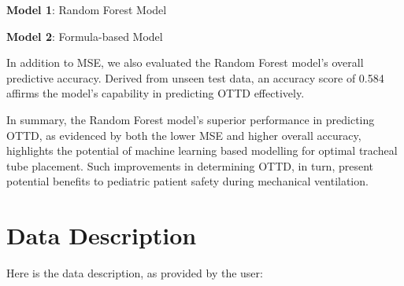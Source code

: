\documentclass[11pt]{article}
\begin{document}
\begin{table}[h]
\caption{Comparison of residuals for Random Forest and Formula-based Models}
\label{table:t1}
\begin{threeparttable}
\renewcommand{\TPTminimum}{\linewidth}
\begin{tablenotes}
\footnotesize
\item \textbf{Model 1}: Random Forest Model
\item \textbf{Model 2}: Formula-based Model
\end{tablenotes}
\end{threeparttable}
\end{table}


In addition to MSE, we also evaluated the Random Forest model's overall predictive accuracy. Derived from unseen test data, an accuracy score of 0.584 affirms the model's capability in predicting OTTD effectively. 

In summary, the Random Forest model's superior performance in predicting OTTD, as evidenced by both the lower MSE and higher overall accuracy, highlights the potential of machine learning based modelling for optimal tracheal tube placement. Such improvements in determining OTTD, in turn, present potential benefits to pediatric patient safety during mechanical ventilation.


\clearpage
\appendix

\section{Data Description} \label{sec:data_description} Here is the data description, as provided by the user:
\end{document}
